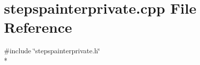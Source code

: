 \section{stepspainterprivate.\+cpp File Reference}
\label{bk3_2curve_2painters_2stepspainterprivate_8cpp}
{\ttfamily \#include \char`\"{}stepspainterprivate.\+h\char`\"{}}\\*
